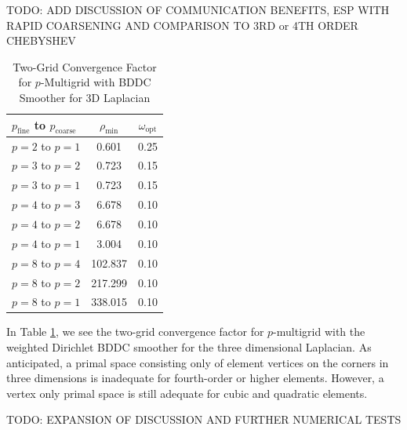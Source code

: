 TODO: ADD DISCUSSION OF COMMUNICATION BENEFITS, ESP WITH RAPID COARSENING AND COMPARISON TO 3RD or 4TH ORDER CHEBYSHEV

\begin{table}[ht!]
\begin{center}
\begin{tabular}{l cc}
  \toprule
  $p_{\text{fine}}$ to $p_{\text{coarse}}$  & $\rho_{\min}$ & $\omega_{\text{opt}}$  \\
  \toprule
  $p = 2$ to $p = 1$   &    0.601 & 0.25  \\
  \midrule
  $p = 3$ to $p = 2$   &    0.723 & 0.15  \\
  $p = 3$ to $p = 1$   &    0.723 & 0.15  \\
  \midrule
  $p = 4$ to $p = 3$   &    6.678 & 0.10  \\
  $p = 4$ to $p = 2$   &    6.678 & 0.10  \\
  $p = 4$ to $p = 1$   &    3.004 & 0.10  \\
  \midrule
  $p = 8$ to $p = 4$   &  102.837 & 0.10  \\
  $p = 8$ to $p = 2$   &  217.299 & 0.10  \\
  $p = 8$ to $p = 1$   &  338.015 & 0.10  \\
  \bottomrule
\end{tabular}
\end{center}
\caption{Two-Grid Convergence Factor for $p$-Multigrid with BDDC Smoother for 3D Laplacian}
\label{table:two_grid_bddc_smoother_3d}
\end{table}

In Table \ref{table:two_grid_bddc_smoother_3d}, we see the two-grid convergence factor for $p$-multigrid with the weighted Dirichlet BDDC smoother for the three dimensional Laplacian.
As anticipated, a primal space consisting only of element vertices on the corners in three dimensions is inadequate for fourth-order or higher elements.
However, a vertex only primal space is still adequate for cubic and quadratic elements.


TODO: EXPANSION OF DISCUSSION AND FURTHER NUMERICAL TESTS
